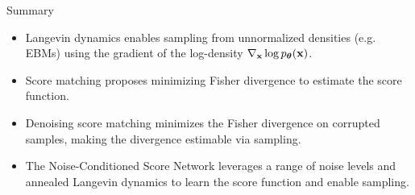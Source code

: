 \documentclass{beamer}
\begin{document}
\begin{frame}{Summary}
	\begin{itemize}
		\item Langevin dynamics enables sampling from unnormalized densities (e.g. EBMs) using the gradient of the log-density $\nabla_{\mathbf{x}} \log p_{\boldsymbol{\theta}}(\mathbf{x})$.
		\vfill
		\item Score matching proposes minimizing Fisher divergence to estimate the score function.
		\vfill
		\item Denoising score matching minimizes the Fisher divergence on corrupted samples, making the divergence estimable via sampling.
		\vfill
		\item The Noise-Conditioned Score Network leverages a range of noise levels and annealed Langevin dynamics to learn the score function and enable sampling.
	\end{itemize}
\end{frame}
\end{document}
